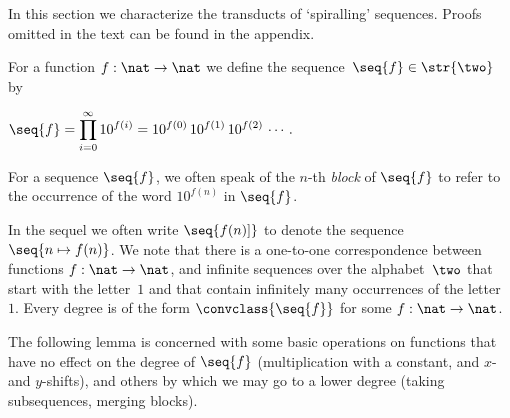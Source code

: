 
In this section we characterize the transducts of `spiralling' sequences.
Proofs omitted in the text can be found in the appendix.


\begin{definition}\label{def:seq}
  For a function $f : \nat \to \nat$ we define the sequence~$\seq{f} \in \str{\two}$
  by 
  \begin{center}
  $\displaystyle \seq{f} = \prod_{i = 0}^{\infty} 1 0^{f(i)} = 1 0^{f(0)} \, 1 0^{f(1)} \, 1 0^{f(2)} \, \cdots\,.
  $\end{center}
  For a sequence $\seq{f}$, we often speak of the $n$-th \emph{block} of $\seq{f}$ 
  to refer to the occurrence of the word $10^{f(n)}$ in $\seq{f}$.
\end{definition}

In the sequel we often write 
$\seq{f(n)]}$ to denote the sequence~$\seq{n \mapsto f(n)}$.
We note that there is a one-to-one correspondence between functions $f : \nat \to \nat$,
and infinite sequences over the alphabet~$\two$ that start with the letter~$1$ and that
contain infinitely many occurrences of the letter~$1$.
Every degree is of the form $\convclass{\seq{f}}$
for some $f : \nat \to \nat$.

The following lemma is concerned with some basic operations on functions
that have no effect on the degree of $\seq{f}$
(multiplication with a constant, and $x$- and $y$-shifts),
and others by which we may go to a lower degree
(taking subsequences, merging blocks).

